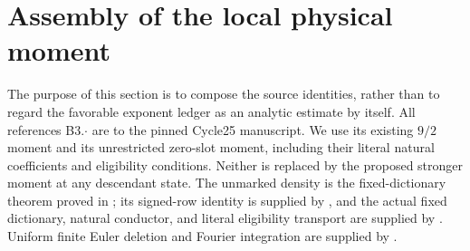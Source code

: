 \section{Assembly of the local physical moment}
\label{sec:physical-local-assembly}

The purpose of this section is to compose the source identities, rather than
to regard the favorable exponent ledger as an analytic estimate by itself.
All references B3.\(\cdot\) are to the pinned Cycle25 manuscript. We use its
existing $9/2$ moment and its unrestricted zero-slot moment, including
their literal natural coefficients and eligibility conditions. Neither is
replaced by the proposed stronger moment at any descendant state.
The unmarked density is the fixed-dictionary theorem proved in
; its signed-row identity is supplied by
, and the actual fixed dictionary,
natural conductor, and literal eligibility transport are supplied by
. Uniform finite Euler deletion
and Fourier integration are supplied by .

